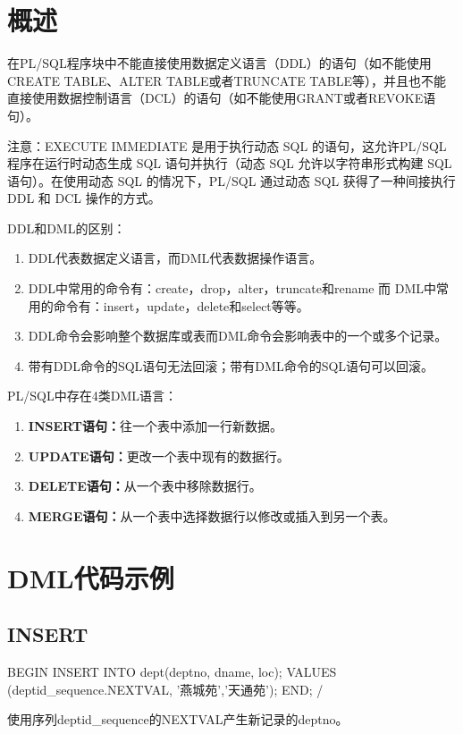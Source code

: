 \documentclass[11pt, a4paper, oneside, UTF8]{ctexbook}
\let\kaishu\relax %
\begin{document}
\section{概述}
在PL/SQL程序块中不能直接使用数据定义语言（DDL）的语句（如不能使用CREATE TABLE、ALTER TABLE或者TRUNCATE TABLE等），并且也不能直接使用数据控制语言（DCL）的语句（如不能使用GRANT或者REVOKE语句）。

注意：EXECUTE IMMEDIATE 是用于执行动态 SQL 的语句，这允许PL/SQL程序在运行时动态生成 SQL 语句并执行（动态 SQL 允许以字符串形式构建 SQL 语句）。在使用动态 SQL 的情况下，PL/SQL 通过动态 SQL 获得了一种间接执行 DDL 和 DCL 操作的方式。

DDL和DML的区别：
\begin{enumerate}
  \item DDL代表数据定义语言，而DML代表数据操作语言。
  \item DDL中常用的命令有：create，drop，alter，truncate和rename 而 DML中常用的命令有：insert，update，delete和select等等。
  \item DDL命令会影响整个数据库或表而DML命令会影响表中的一个或多个记录。
  \item 带有DDL命令的SQL语句无法回滚；带有DML命令的SQL语句可以回滚。
\end{enumerate}

PL/SQL中存在4类DML语言：
\begin{enumerate}
  \item {\bfseries\kaishu INSERT语句：}往一个表中添加一行新数据。
  \item {\bfseries\kaishu UPDATE语句：}更改一个表中现有的数据行。
  \item {\bfseries\kaishu DELETE语句：}从一个表中移除数据行。
  \item {\bfseries\kaishu MERGE语句：}从一个表中选择数据行以修改或插入到另一个表。
\end{enumerate}

\section{DML代码示例}
\subsection{INSERT}
\begin{plsql}[caption=INSERT代码示例]
BEGIN
  INSERT INTO dept(deptno, dname, loc);
  VALUES (deptid_sequence.NEXTVAL, '燕城苑','天通苑');
END;
/
\end{plsql}
使用序列deptid\_sequence的NEXTVAL产生新记录的deptno。
\end{document}
